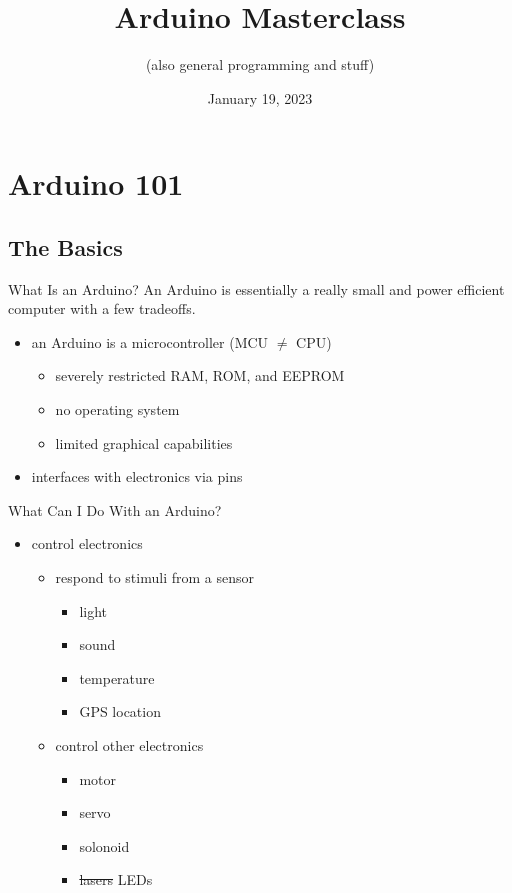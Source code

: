 \documentclass{beamer}
\title{Arduino Masterclass}
\subtitle{(also general programming and stuff)}
\date{January 19, 2023}
\begin{document}
	\begin{frame}
		\titlepage
	\end{frame}

	\begin{frame}
		\tableofcontents
	\end{frame}

	\section{Arduino 101}
	\subsection{The Basics}
	\begin{frame}{What Is an Arduino?}
		An Arduino is essentially a really small and power efficient computer with a few tradeoffs.

		\begin{itemize}
			\item an Arduino is a microcontroller (MCU $\neq$ CPU)
			\begin{itemize}
				\item severely restricted RAM, ROM, and EEPROM
				\item no operating system
				\item limited graphical capabilities
			\end{itemize}
			\item interfaces with electronics via pins
		\end{itemize}
	\end{frame}

	\begin{frame}{What Can I Do With an Arduino?}
		\begin{itemize}
			\item control electronics
			\begin{itemize}
				\item respond to stimuli from a sensor
				\begin{itemize}
					\item light
					\item sound
					\item temperature
					\item GPS location
				\end{itemize}

				\item control other electronics
				\begin{itemize}
					\item motor
					\item servo
					\item solonoid
					\item \sout{lasers} LEDs
				\end{itemize}
			\end{itemize}
		\end{itemize}
	\end{frame}
\end{document}
